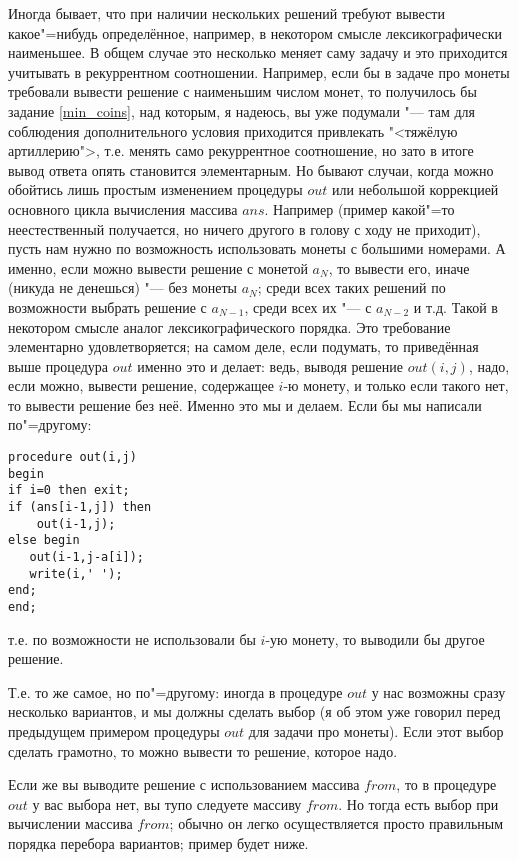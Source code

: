 Иногда бывает, что при наличии нескольких решений требуют вывести какое"=нибудь определённое,
например, в некотором смысле лексикографически наименьшее. В общем случае это несколько меняет саму
задачу и это приходится учитывать в рекуррентном соотношении. Например, если бы в задаче про монеты
требовали вывести решение с наименьшим числом монет, то получилось бы задание \ref{min_coins}, над
которым, я надеюсь, вы уже подумали "--- там для соблюдения дополнительного условия приходится
привлекать "<тяжёлую артиллерию">, т.е. менять само рекуррентное соотношение, но зато в итоге вывод
ответа опять становится элементарным. Но бывают случаи, когда можно обойтись лишь простым изменением
процедуры $out$ или небольшой коррекцией основного цикла вычисления массива $ans$. Например (пример
какой"=то неестественный получается, но ничего другого в голову с ходу не приходит), пусть нам нужно
по возможность использовать монеты с большими номерами. А именно, если можно вывести решение с
монетой $a_N$, то вывести его, иначе (никуда не денешься) "--- без монеты $a_N$; среди всех таких
решений по возможности выбрать решение с $a_{N-1}$, среди всех их "--- с $a_{N-2}$ и т.д. Такой в
некотором смысле аналог лексикографического порядка. Это требование элементарно удовлетворяется; на
самом деле, если подумать, то приведённая выше процедура $out$ именно это и делает: ведь, выводя
решение $out(i,j)$, надо, если можно, вывести решение, содержащее $i$-ю монету, и только если такого
нет, то вывести решение без неё. Именно это мы и делаем. Если бы мы написали по"=другому:
\begin{codesampleo}\begin{verbatim}
procedure out(i,j)
begin
if i=0 then exit;
if (ans[i-1,j]) then 
    out(i-1,j);
else begin
   out(i-1,j-a[i]);
   write(i,' ');
end;
end;
\end{verbatim}
\end{codesampleo}
т.е. по возможности не использовали бы $i$-ую монету, то выводили бы другое решение. 

Т.е. то же самое, но по"=другому: иногда в процедуре $out$ у нас возможны сразу несколько вариантов, и мы должны сделать выбор (я об этом уже говорил перед предыдущем примером процедуры $out$ для задачи про монеты). Если этот выбор сделать грамотно, то можно вывести то решение, которое надо.

Если же вы выводите решение с использованием массива $from$, то в процедуре $out$ у вас выбора нет, вы тупо следуете массиву $from$. Но тогда есть выбор при вычислении массива $from$; обычно он легко осуществляется просто правильным порядка перебора вариантов; пример будет ниже.

